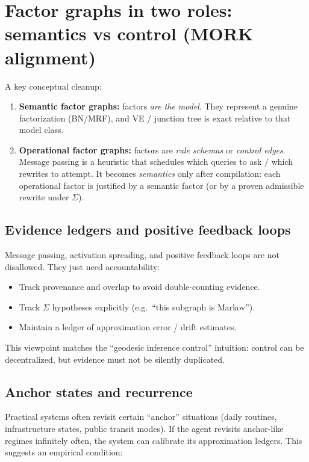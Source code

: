 \documentclass[11pt]{article}
\begin{document}
\section{Factor graphs in two roles: semantics vs control (MORK alignment)}

A key conceptual cleanup:

\begin{enumerate}[leftmargin=2em]
\item \textbf{Semantic factor graphs:} factors \emph{are the model}.
They represent a genuine factorization (BN/MRF), and VE / junction tree is exact
relative to that model class.
\item \textbf{Operational factor graphs:} factors are \emph{rule schemas} or \emph{control edges}.
Message passing is a heuristic that schedules which queries to ask / which rewrites to attempt.
It becomes \emph{semantics} only after compilation: each operational factor is justified by
a semantic factor (or by a proven admissible rewrite under $\Sigma$).
\end{enumerate}

\subsection{Evidence ledgers and positive feedback loops}

Message passing, activation spreading, and positive feedback loops are not disallowed.
They just need accountability:

\begin{itemize}[leftmargin=2em]
\item Track provenance and overlap to avoid double-counting evidence.
\item Track $\Sigma$ hypotheses explicitly (e.g.\ ``this subgraph is Markov'').
\item Maintain a ledger of approximation error / drift estimates.
\end{itemize}

This viewpoint matches the ``geodesic inference control'' intuition:
control can be decentralized, but evidence must not be silently duplicated.

\subsection{Anchor states and recurrence}

Practical systems often revisit certain ``anchor'' situations (daily routines, infrastructure states,
public transit modes). If the agent revisits anchor-like regimes infinitely often, the system can
calibrate its approximation ledgers. This suggests an empirical condition:
\end{document}
